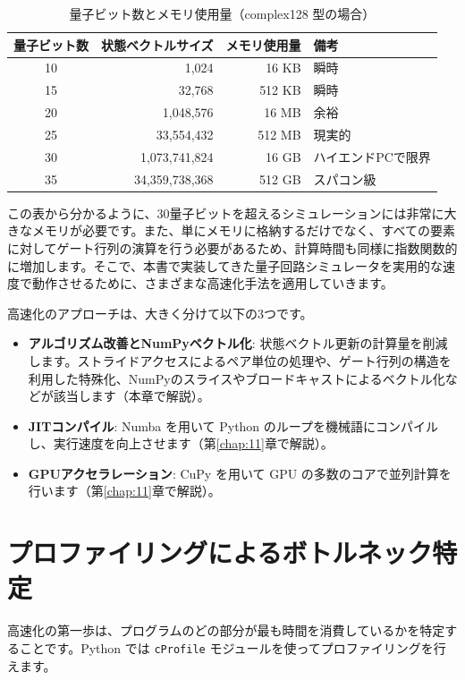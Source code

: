 \begin{table}[htbp]
\centering
\begin{tabular}{crrl}
\hline
\textbf{量子ビット数} & \textbf{状態ベクトルサイズ} & \textbf{メモリ使用量} & \textbf{備考} \\ \hline
10 & 1,024 & 16 KB & 瞬時 \\
15 & 32,768 & 512 KB & 瞬時 \\
20 & 1,048,576 & 16 MB & 余裕 \\
25 & 33,554,432 & 512 MB & 現実的 \\
30 & 1,073,741,824 & 16 GB & ハイエンドPCで限界 \\
35 & 34,359,738,368 & 512 GB & スパコン級 \\ \hline
\end{tabular}
\caption{量子ビット数とメモリ使用量（complex128 型の場合）}
\label{tab:memory_usage}
\end{table}

この表から分かるように、30量子ビットを超えるシミュレーションには非常に大きなメモリが必要です。また、単にメモリに格納するだけでなく、すべての要素に対してゲート行列の演算を行う必要があるため、計算時間も同様に指数関数的に増加します。そこで、本書で実装してきた量子回路シミュレータを実用的な速度で動作させるために、さまざまな高速化手法を適用していきます。

高速化のアプローチは、大きく分けて以下の3つです。

\begin{itemize}
\item \textbf{アルゴリズム改善とNumPyベクトル化}: 状態ベクトル更新の計算量を削減します。ストライドアクセスによるペア単位の処理や、ゲート行列の構造を利用した特殊化、NumPyのスライスやブロードキャストによるベクトル化などが該当します（本章で解説）。
\item \textbf{JITコンパイル}: Numba を用いて Python のループを機械語にコンパイルし、実行速度を向上させます（第\ref{chap:11}章で解説）。
\item \textbf{GPUアクセラレーション}: CuPy を用いて GPU の多数のコアで並列計算を行います（第\ref{chap:11}章で解説）。
\end{itemize}

\section{プロファイリングによるボトルネック特定}

高速化の第一歩は、プログラムのどの部分が最も時間を消費しているかを特定することです。Python では \texttt{cProfile} モジュールを使ってプロファイリングを行えます。

